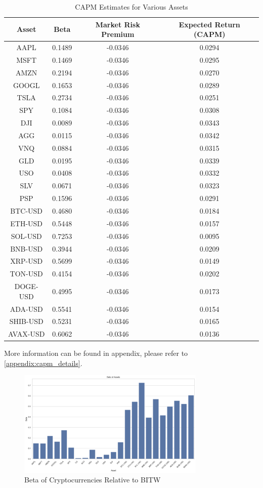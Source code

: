 \begin{table}[h]
\centering
\begin{tabular}{|c|c|c|c|}
\hline
\textbf{Asset} & \textbf{Beta} & \textbf{Market Risk Premium} & \textbf{Expected Return (CAPM)} \\
\hline
AAPL & 0.1489 & -0.0346 & 0.0294 \\
MSFT & 0.1469 & -0.0346 & 0.0295 \\
AMZN & 0.2194 & -0.0346 & 0.0270 \\
GOOGL & 0.1653 & -0.0346 & 0.0289 \\
TSLA & 0.2734 & -0.0346 & 0.0251 \\
SPY & 0.1084 & -0.0346 & 0.0308 \\
DJI & 0.0089 & -0.0346 & 0.0343 \\
AGG & 0.0115 & -0.0346 & 0.0342 \\
VNQ & 0.0884 & -0.0346 & 0.0315 \\
GLD & 0.0195 & -0.0346 & 0.0339 \\
USO & 0.0408 & -0.0346 & 0.0332 \\
SLV & 0.0671 & -0.0346 & 0.0323 \\
PSP & 0.1596 & -0.0346 & 0.0291 \\
BTC-USD & 0.4680 & -0.0346 & 0.0184 \\
ETH-USD & 0.5448 & -0.0346 & 0.0157 \\
SOL-USD & 0.7253 & -0.0346 & 0.0095 \\
BNB-USD & 0.3944 & -0.0346 & 0.0209 \\
XRP-USD & 0.5699 & -0.0346 & 0.0149 \\
TON-USD & 0.4154 & -0.0346 & 0.0202 \\
DOGE-USD & 0.4995 & -0.0346 & 0.0173 \\
ADA-USD & 0.5541 & -0.0346 & 0.0154 \\
SHIB-USD & 0.5231 & -0.0346 & 0.0165 \\
AVAX-USD & 0.6062 & -0.0346 & 0.0136 \\
\hline
\end{tabular}
\caption{CAPM Estimates for Various Assets}
\label{tab:capm}
\end{table}


More information can be found in appendix, please refer to \ref{appendix:capm_details}.


\begin{figure}
    \centering
    \includegraphics[width=0.8\textwidth]{./code/risk-and-return-analysis/capm/beta_assets.png}
    \caption{Beta of Cryptocurrencies Relative to BITW}
    \label{fig:beta}
\end{figure}


